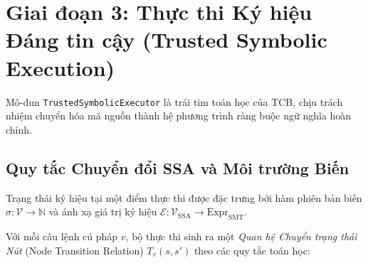 \section{Giai đoạn 3: Thực thi Ký hiệu Đáng tin cậy (Trusted Symbolic Execution)}
\label{sec:trusted_symbolic_execution}

Mô-đun \texttt{TrustedSymbolicExecutor} là trái tim toán học của TCB, chịu trách nhiệm chuyển hóa mã nguồn thành hệ phương trình ràng buộc ngữ nghĩa hoàn chỉnh.

\subsection{Quy tắc Chuyển đổi SSA và Môi trường Biến}
Trạng thái ký hiệu tại một điểm thực thi được đặc trưng bởi hàm phiên bản biến $\sigma: \mathcal{V} \rightarrow \mathbb{N}$ và ánh xạ giá trị ký hiệu $\mathcal{E}: \mathcal{V}_{\text{SSA}} \rightarrow \text{Expr}_{\text{SMT}}$.

Với mỗi câu lệnh cú pháp $v$, bộ thực thi sinh ra một \textit{Quan hệ Chuyển trạng thái Nút} (Node Transition Relation) $T_v(s, s')$ theo các quy tắc toán học:

